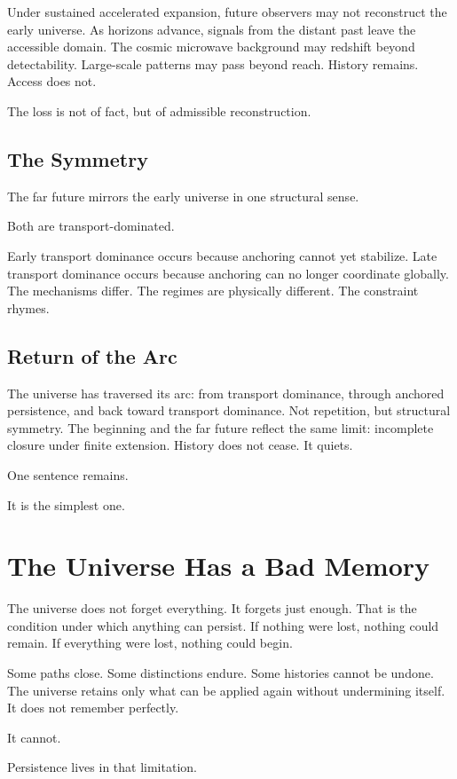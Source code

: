 \documentclass[11pt,twoside,openright]{book}
\begin{document}
Under sustained accelerated expansion, future observers may not reconstruct the early universe. As horizons advance, signals from the distant past leave the accessible domain. The cosmic microwave background may redshift beyond detectability. Large-scale patterns may pass beyond reach. History remains. Access does not.

The loss is not of fact, but of admissible reconstruction.

\section*{The Symmetry}

The far future mirrors the early universe in one structural sense.

Both are transport-dominated.

Early transport dominance occurs because anchoring cannot yet stabilize. Late transport dominance occurs because anchoring can no longer coordinate globally. The mechanisms differ. The regimes are physically different. The constraint rhymes.

\section*{Return of the Arc}

The universe has traversed its arc: from transport dominance, through anchored persistence, and back toward transport dominance. Not repetition, but structural symmetry. The beginning and the far future reflect the same limit: incomplete closure under finite extension. History does not cease. It quiets.

One sentence remains.

It is the simplest one.
\chapter{The Universe Has a Bad Memory}

The universe does not forget everything. It forgets just enough. That is the condition under which anything can persist. If nothing were lost, nothing could remain. If everything were lost, nothing could begin.

Some paths close. Some distinctions endure. Some histories cannot be undone. The universe retains only what can be applied again without undermining itself. It does not remember perfectly.

It cannot.

Persistence lives in that limitation.
\end{document}
